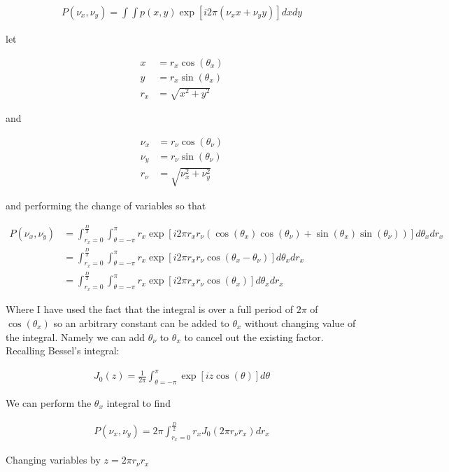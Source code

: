 \documentclass[12pt]{article}
\begin{document}
\begin{align}
P(\nu_x,\nu_y) = \int \int p(x,y) \exp[i 2\pi (\nu_x x + \nu_y y)] dx dy
\end{align}

let

\begin{align}
x &= r_x \cos(\theta_x)\\
y &= r_x \sin(\theta_x)\\
r_x &= \sqrt{x^2+y^2}
\end{align}

and

\begin{align}
\nu_x &= r_{\nu} \cos(\theta_{\nu})\\
\nu_y &= r_{\nu} \sin(\theta_{\nu})\\
r_{\nu} &= \sqrt{\nu_x^2+\nu_y^2}
\end{align}

and performing the change of variables so that

\begin{align}
P(\nu_x,\nu_y) &= \int_{r_x=0}^{\frac{D}{2}} \int_{\theta=-\pi}^{\pi} r_x \exp[i2\pi r_x r_{\nu} (\cos(\theta_x)\cos(\theta_{\nu}) + \sin(\theta_x)\sin(\theta_{\nu}))]  d\theta_x dr_x\\
&= \int_{r_x=0}^{\frac{D}{2}} \int_{\theta=-\pi}^{\pi} r_x \exp[i2\pi r_xr_{\nu} \cos(\theta_x-\theta_{\nu})]d\theta_xdr_x\\
&= \int_{r_x=0}^{\frac{D}{2}} \int_{\theta=-\pi}^{\pi} r_x \exp[i2\pi r_xr_{\nu} \cos(\theta_x)] d\theta_xdr_x
\end{align}

Where I have used the fact that the integral is over a full period of $2\pi$ of $\cos(\theta_x)$ so an arbitrary constant can be added to $\theta_x$ without changing value of the integral. Namely we can add $\theta_{\nu}$ to $\theta_x$ to cancel out the existing factor. Recalling Bessel's integral:

\begin{align}
J_0(z) = \frac{1}{2\pi}\int_{\theta=-\pi}^{\pi} \exp[i z\cos(\theta)] d\theta
\end{align}

We can perform the $\theta_x$ integral to find

\begin{align}
P(\nu_x,\nu_y) = 2\pi \int_{r_x = 0}^{\frac{D}{2}} r_x J_0(2\pi r_{\nu} r_x) dr_x
\end{align}

Changing variables by $z = 2\pi r_{\nu} r_x$
\end{document}
